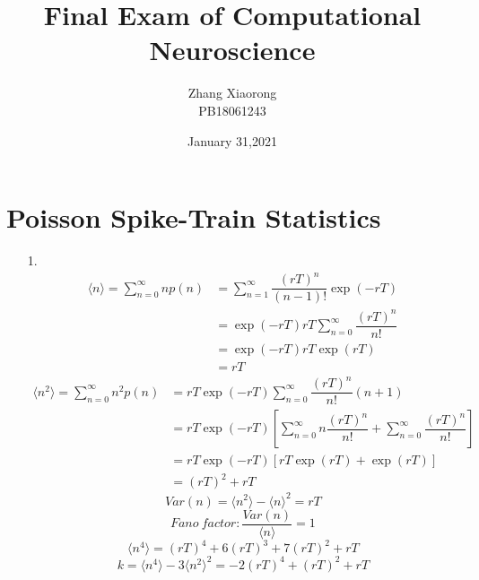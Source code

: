 \documentclass{article}
\title{Final Exam of Computational Neuroscience}
\author{Zhang Xiaorong\\ PB18061243}
\date{January 31,2021}
\begin{document}
\maketitle

\section*{Poisson Spike-Train Statistics}
\begin{enumerate}
    \item[1.]\begin{equation}
              \begin{split}
                  \langle n \rangle = \sum^\infty_{n=0} np(n) &= \sum^{\infty}_{n = 1}\dfrac{(rT)^n}{(n-1)!}\exp(-rT)\\
                  &=\exp(-rT)rT\sum_{n = 0}^\infty\dfrac{(rT)^n}{n!}\\
                  &=\exp(-rT) rT \exp(rT)\\
                  & = rT
              \end{split}
          \end{equation}
          \begin{equation}
              \begin{split}
                  \langle n^2 \rangle = \sum^\infty_{n=0} n^2p(n) &= rT \exp(-rT)\sum^{\infty}_{n = 0}\dfrac{(rT)^n}{n!}(n+1)\\
                  &=rT\exp(-rT)\left[\sum_{n = 0}^\infty n\dfrac{(rT)^n}{n!}+\sum_{n = 0}^\infty \dfrac{(rT)^n}{n!}\right]\\
                  &=rT\exp(-rT)\left[rT\exp(rT)+\exp(rT)\right]\\
                  & =(rT)^2+rT
              \end{split}
          \end{equation}
          \begin{equation}
              Var(n)= \langle n^2 \rangle-\langle n \rangle ^2= rT
          \end{equation}
          \begin{equation}
              Fano\ factor:\dfrac{Var(n)}{\langle n \rangle} = 1
          \end{equation}
          \begin{equation}
              \langle n^4 \rangle  = (rT)^4+6(rT)^3+7(rT)^2+rT
          \end{equation}
          \begin{equation}
              k =\langle n^4\rangle -3\langle n^2\rangle ^2 = -2(rT)^4+(rT)^2+rT

\end{equation}
\end{enumerate}
\end{document}
